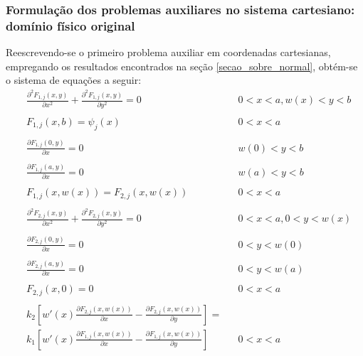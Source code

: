 \subsubsection{Formulação dos problemas auxiliares no sistema cartesiano: domínio físico original}

Reescrevendo-se o primeiro problema auxiliar em coordenadas cartesianas, empregando os resultados encontrados na seção \ref{secao_sobre_normal}, obtém-se o sistema de equações a seguir:
\begin{subequations}
\begin{alignat}{2}
	& \frac{\partial^2 F_{1,j}(x, y)}{\partial x^2} + \frac{\partial^2 F_{1,j}(x, y)}{\partial y^2} = 0  && 0 < x < a, w(x) < y < b \label{funcao_F_harm_T1_cart} \\ \nonumber \\
	& F_{1,j}(x, b) = \psi_j(x) && 0 < x < a  \label{funcao_F_cc_T1_2_cart} \\ \nonumber \\
	& \frac{\partial F_{1,j}(0, y)}{\partial x} = 0 && w(0) < y < b \label{funcao_F_cc_T1_1a_cart} \\ \nonumber \\
	& \frac{\partial F_{1,j}(a, y)}{\partial x} = 0 && w(a) < y < b \label{funcao_F_cc_T1_1b_cart} \\ \nonumber \\
	& F_{1,j}(x, w(x)) = F_{2, j}(x, w(x)) && 0 < x < a \label{funcao_F_cc_grad_T1_cart} \\ \nonumber \\
	& \frac{\partial^2 F_{2,j}(x, y)}{\partial x^2} + \frac{\partial^2 F_{2,j}(x, y)}{\partial y^2} = 0 &&  0 < x < a, 0 < y < w(x) \label{funcao_F_harm_T2_cart} \\ \nonumber \\
	& \frac{\partial F_{2,j}(0, y)}{\partial x} = 0 && 0 < y < w(0) \label{funcao_F_cc_T1_3a_cart} \\ \nonumber \\
	& \frac{\partial F_{2,j}(a, y)}{\partial x} = 0 && 0 < y < w(a) \label{funcao_F_cc_T1_3b_cart} \\ \nonumber \\
	& F_{2,j}(x, 0) = 0 && 0 < x < a \label{funcao_F_cc_T1_4_cart} \\ \nonumber \\
	& k_2\left[w'(x)\frac{\partial F_{2,j}(x, w(x))}{\partial x} - \frac{\partial F_{2,j}(x, w(x))}{\partial y}\right] = \nonumber \\
	& k_1\left[w'(x)\frac{\partial F_{1,j}(x, w(x))}{\partial x} - \frac{\partial F_{1,j}(x, w(x))}{\partial y}\right] && 0 < x < a \label{funcao_F_cc_T1_5_cart}
\end{alignat}
\end{subequations}

